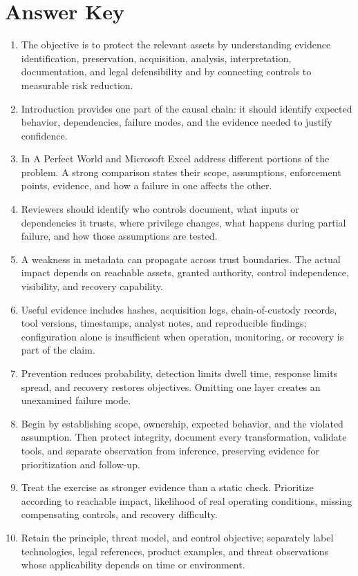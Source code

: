 \documentclass[11pt]{article}
\begin{document}
\section*{Answer Key}
\begin{enumerate}
\item The objective is to protect the relevant assets by understanding evidence identification, preservation, acquisition, analysis, interpretation, documentation, and legal defensibility and by connecting controls to measurable risk reduction.
\item Introduction provides one part of the causal chain: it should identify expected behavior, dependencies, failure modes, and the evidence needed to justify confidence.
\item In A Perfect World and Microsoft Excel address different portions of the problem. A strong comparison states their scope, assumptions, enforcement points, evidence, and how a failure in one affects the other.
\item Reviewers should identify who controls document, what inputs or dependencies it trusts, where privilege changes, what happens during partial failure, and how those assumptions are tested.
\item A weakness in metadata can propagate across trust boundaries. The actual impact depends on reachable assets, granted authority, control independence, visibility, and recovery capability.
\item Useful evidence includes hashes, acquisition logs, chain-of-custody records, tool versions, timestamps, analyst notes, and reproducible findings; configuration alone is insufficient when operation, monitoring, or recovery is part of the claim.
\item Prevention reduces probability, detection limits dwell time, response limits spread, and recovery restores objectives. Omitting one layer creates an unexamined failure mode.
\item Begin by establishing scope, ownership, expected behavior, and the violated assumption. Then protect integrity, document every transformation, validate tools, and separate observation from inference, preserving evidence for prioritization and follow-up.
\item Treat the exercise as stronger evidence than a static check. Prioritize according to reachable impact, likelihood of real operating conditions, missing compensating controls, and recovery difficulty.
\item Retain the principle, threat model, and control objective; separately label technologies, legal references, product examples, and threat observations whose applicability depends on time or environment.
\end{enumerate}
\end{document}
